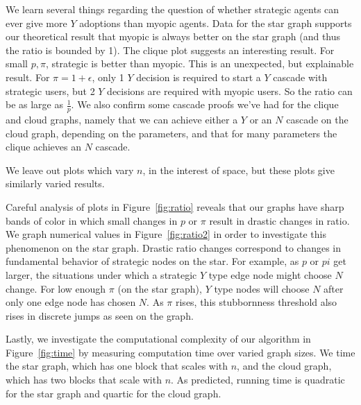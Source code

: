 \documentclass{article}
\begin{document}
We learn several things regarding the question of whether strategic
agents can ever give more $Y$ adoptions than myopic agents. Data for
the star graph supports our theoretical result that myopic is always
better on the star graph (and thus the ratio is bounded by 1). The
clique plot suggests an interesting result. For small $p, \pi$,
strategic is better than myopic. This is an unexpected, but
explainable result. For $\pi=1+\epsilon$, only 1 $Y$ decision is
required to start a $Y$ cascade with strategic users, but 2 $Y$ decisions
are required with myopic users. So the ratio can be as large as
$\frac{1}{p}$. We also confirm some cascade proofs we've had for the
clique and cloud graphs, namely that we can achieve either a $Y$ or an
$N$ cascade on the cloud graph, depending on the parameters, and that
for many parameters the clique achieves an $N$ cascade.

We leave out plots which vary $n$, in the interest of space, but these
plots give similarly varied results.

Careful analysis of plots in Figure~\ref{fig:ratio} reveals that our
graphs have sharp bands of color in which small changes in $p$ or
$\pi$ result in drastic changes in ratio. We graph numerical values in
Figure~\ref{fig:ratio2} in order to investigate this phenomenon on the
star graph. Drastic ratio changes correspond to changes in fundamental
behavior of strategic nodes on the star. For example, as $p$ or $pi$
get larger, the situations under which a strategic $Y$ type edge node
might choose $N$ change. For low enough $\pi$ (on the star graph), $Y$
type nodes will choose $N$ after only one edge node has chosen $N$. As
$\pi$ rises, this stubbornness threshold also rises in discrete jumps
as seen on the graph.

Lastly, we investigate the computational complexity of our algorithm
in Figure~\ref{fig:time} by measuring computation time over varied
graph sizes. We time the star graph, which has one block that scales
with $n$, and the cloud graph, which has two blocks that scale with
$n$. As predicted, running time is quadratic for the star graph and
quartic for the cloud graph.
\end{document}
